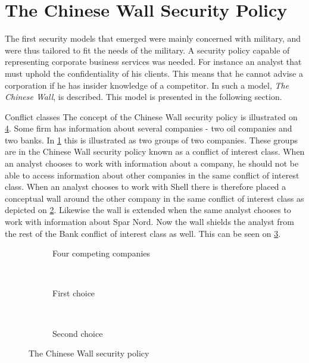 \section{The Chinese Wall Security Policy}
The first security models that emerged were mainly concerned with military, and were thus tailored to fit the needs of the military.
A security policy capable of representing corporate business services was needed.
For instance an analyst that must uphold the confidentiality of his clients.
This means that he cannot advise a corporation if he has insider knowledge of a competitor.
In \citet{brewer1989chinese} such a model, \emph{The Chinese Wall}, is described.
This model is presented in the following section.

\begin{example}{Conflict classes}
The concept of the Chinese Wall security policy is illustrated on \cref{chinese:illu}.
Some firm has information about several companies - two oil companies and two banks.
In \cref{chinese:situation} this is illustrated as two groups of two companies.
These groups are in the Chinese Wall security policy known as a conflict of interest class.
When an analyst chooses to work with information about a company, he should not be able to access information about other companies in the same conflict of interest class.
When an analyst chooses to work with Shell there is therefore placed a conceptual wall around the other company in the same conflict of interest class as depicted on \cref{chinese:choice1}.
Likewise the wall is extended when the same analyst chooses to work with information about Spar Nord.
Now the wall shields the analyst from the rest of the Bank conflict of interest class as well.
This can be seen on \cref{chinese:choice2}.
\end{example}

\begin{figure}[H]
\centering
    \begin{subfigure}[t]{0.3\textwidth}
        \resizebox{\linewidth}{!}{}
        \caption{Four competing companies}
        \label{chinese:situation}
    \end{subfigure}
    ~
    \begin{subfigure}[t]{0.3\textwidth}
        \resizebox{\linewidth}{!}{}
        \caption{First choice}
        \label{chinese:choice1}
    \end{subfigure}
    ~
    \begin{subfigure}[t]{0.3\textwidth}
        \resizebox{\linewidth}{!}{}
        \caption{Second choice}
        \label{chinese:choice2}
    \end{subfigure}
    \caption{The Chinese Wall security policy}\label{chinese:illu}
\end{figure}


